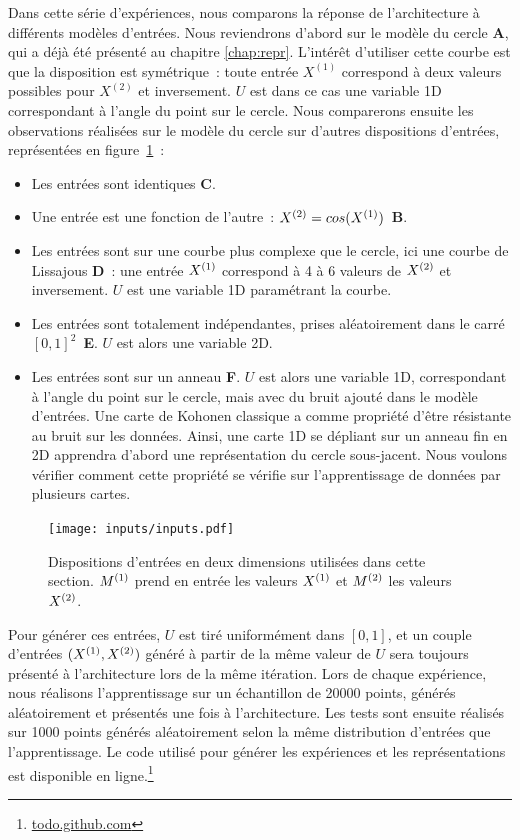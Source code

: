 \documentclass[../main]{subfiles}
\begin{document}
Dans cette série d'expériences, nous comparons la réponse de l'architecture à différents modèles d'entrées.
Nous reviendrons d'abord sur le modèle du cercle \textbf{A}, qui a déjà été présenté au chapitre \ref{chap:repr}. L'intérêt d'utiliser cette courbe est que la disposition est symétrique~: toute entrée $X^{(1)}$ correspond à deux valeurs possibles pour $X^{(2)}$ et inversement. $U$ est dans ce cas une variable 1D correspondant à l'angle du point sur le cercle.
Nous comparerons ensuite les observations réalisées sur le modèle du cercle sur d'autres dispositions d'entrées, représentées en figure~\ref{fig:input_list}~:
\begin{itemize}
	\item Les entrées sont identiques \textbf{C}.
	\item Une entrée est une fonction de l'autre~: $X^{({2})} = cos(X^{({1})})$~\textbf{B}.
	\item Les entrées sont sur une courbe plus complexe que le cercle, ici une courbe de Lissajous \textbf{D}~: une entrée $X^{({1})}$ correspond à 4 à 6 valeurs de $X^{({2})}$ et inversement. $U$ est une variable 1D paramétrant la courbe.
	\item Les entrées sont totalement indépendantes, prises aléatoirement dans le carré $[0,1]^2$~\textbf{E}. $U$ est alors une variable 2D.
	\item Les entrées sont sur un anneau \textbf{F}. $U$ est alors une variable 1D, correspondant à l'angle du point sur le cercle, mais avec du bruit ajouté dans le modèle d'entrées. 
	Une carte de Kohonen classique a comme propriété d'être résistante au bruit sur les données. Ainsi, une carte 1D se dépliant sur un anneau fin en 2D apprendra d'abord une représentation du cercle sous-jacent. Nous voulons vérifier comment cette propriété se vérifie sur l'apprentissage de données par plusieurs cartes.
\end{itemize}

\begin{figure}[h!]
	\texttt{[image: inputs/inputs.pdf]}
	\caption{Dispositions d'entrées en deux dimensions utilisées dans cette section. $M^{({1})}$ prend en entrée les valeurs $X^{({1})}$ et $M^{({2})}$ les valeurs $X^{({2})}$. \label{fig:input_list}}
\end{figure}

Pour générer ces entrées, $U$ est tiré uniformément dans $[0,1]$, et un couple d'entrées $(X^{({1})},X^{({2})})$ généré à partir de la même valeur de $U$ sera toujours présenté à l'architecture lors de la même itération.
Lors de chaque expérience, nous réalisons l'apprentissage sur un échantillon de 20000 points, générés aléatoirement et présentés une fois à l'architecture. Les tests sont ensuite réalisés sur 1000 points générés aléatoirement selon la même distribution d'entrées que l'apprentissage.
Le code utilisé pour générer les expériences et les représentations est disponible en ligne.\footnote{\url{todo.github.com}}
\end{document}
